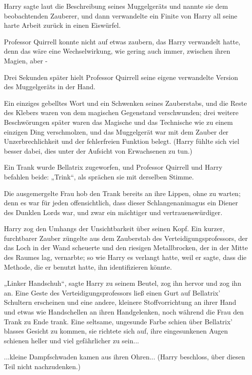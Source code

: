 {Harry sagte laut die Beschreibung seines Muggelgeräts und nannte sie dem beobachtenden Zauberer, und dann verwandelte ein Finite von Harry all seine harte Arbeit zurück in einen Eiswürfel.

Professor Quirrell konnte nicht auf etwas zaubern, das Harry verwandelt hatte, denn das wäre eine Wechselwirkung, wie gering auch immer, zwischen ihren Magien, aber -

Drei Sekunden später hielt Professor Quirrell seine eigene verwandelte Version des Muggelgeräts in der Hand.

Ein einziges gebelltes Wort und ein Schwenken seines Zauberstabs, und die Reste des Klebers waren von dem magischen Gegenstand verschwunden; drei weitere Beschwörungen später waren das Magische und das Technische wie zu einem einzigen Ding verschmolzen, und das Muggelgerät war mit dem Zauber der Unzerbrechlichkeit und der fehlerfreien Funktion belegt. (Harry fühlte sich viel besser dabei, dies unter der Aufsicht von Erwachsenen zu tun.)

Ein Trank wurde Bellatrix zugeworfen, und Professor Quirrell und Harry befahlen beide: „Trink“, als sprächen sie mit derselben Stimme.

Die ausgemergelte Frau hob den Trank bereits an ihre Lippen, ohne zu warten; denn es war für jeden offensichtlich, dass dieser Schlangenanimagus ein Diener des Dunklen Lords war, und zwar ein mächtiger und vertrauenswürdiger.

Harry zog den Umhangs der Unsichtbarkeit über seinen Kopf. Ein kurzer, furchtbarer Zauber züngelte aus dem Zauberstab des Verteidigungsprofessors, der das Loch in der Wand scheuerte und den riesigen Metallbrocken, der in der Mitte des Raumes lag, vernarbte; so wie Harry es verlangt hatte, weil er sagte, dass die Methode, die er benutzt hatte, ihn identifizieren könnte.

„Linker Handschuh“, sagte Harry zu seinem Beutel, zog ihn hervor und zog ihn an. Eine Geste des Verteidigungsprofessors ließ einen Gurt auf Bellatrix' Schultern erscheinen und eine andere, kleinere Stoffvorrichtung an ihrer Hand und etwas wie Handschellen an ihren Handgelenken, noch während die Frau den Trank zu Ende trank. Eine seltsame, ungesunde Farbe schien über Bellatrix' blasses Gesicht zu kommen, sie richtete sich auf, ihre eingesunkenen Augen schienen heller und viel gefährlicher zu sein...

...kleine Dampfschwaden kamen aus ihren Ohren... (Harry beschloss, über diesen Teil nicht nachzudenken.)

}
